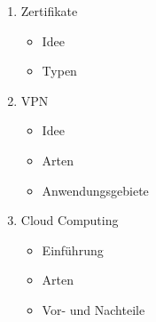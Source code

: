 \documentclass[a4paper]{report}
\begin{document}
\begin{enumerate}
\item Zertifikate
\begin{itemize}
\item Idee
\item Typen
\end{itemize}

\item VPN
\begin{itemize}
\item Idee
\item Arten
\item Anwendungsgebiete
\end{itemize}

\item Cloud Computing
\begin{itemize}
\item Einführung
\item Arten
\item Vor- und Nachteile
\end{itemize}
\end{enumerate}
\end{document}
